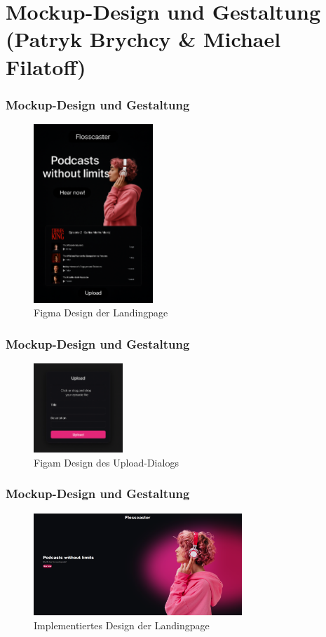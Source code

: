 \documentclass{beamer}
\begin{document}
\section{Mockup-Design und Gestaltung \small{(Patryk Brychcy \& Michael Filatoff)}}
\begin{frame}
  \frametitle{Mockup-Design und Gestaltung}
  \begin{figure}[h]
    \caption{Figma Design der Landingpage}
    \centering
    \includegraphics[width=0.4\textwidth]{flosscaster1.png}
  \end{figure}
\end{frame}

\begin{frame}
  \frametitle{Mockup-Design und Gestaltung}
  \begin{figure}[h]
    \caption{Figam Design des Upload-Dialogs}
    \centering
    \includegraphics[width=0.3\textwidth]{flosscaster2.png}
  \end{figure}
\end{frame}

\begin{frame}
  \frametitle{Mockup-Design und Gestaltung}
  \begin{figure}[h]
    \caption{Implementiertes Design der Landingpage}
    \centering
    \includegraphics[width=0.7\textwidth]{flosscaster3.png}
  \end{figure}
\end{frame}
\end{document}
